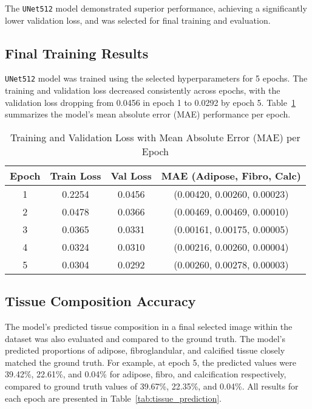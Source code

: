 The \texttt{UNet512} model demonstrated superior performance, achieving a significantly lower validation 
loss, and was selected for final training and evaluation.

\subsection{Final Training Results}

\texttt{UNet512} model was trained using the selected hyperparameters for 5 epochs. The training and validation 
loss decreased consistently across epochs, with the validation loss dropping from 0.0456 in epoch 1 to 0.0292 by 
epoch 5. Table~\ref{tab:final_metrics} summarizes the model's mean absolute error (MAE) performance per epoch.

\begin{table}[h]
\centering
\caption{Training and Validation Loss with Mean Absolute Error (MAE) per Epoch}
\label{tab:final_metrics}
\begin{tabular}{cccc}
\toprule
\textbf{Epoch} & \textbf{Train Loss} & \textbf{Val Loss} & \textbf{MAE (Adipose, Fibro, Calc)} \\
\midrule
1 & 0.2254 & 0.0456 & (0.00420, 0.00260, 0.00023) \\
2 & 0.0478 & 0.0366 & (0.00469, 0.00469, 0.00010) \\
3 & 0.0365 & 0.0331 & (0.00161, 0.00175, 0.00005) \\
4 & 0.0324 & 0.0310 & (0.00216, 0.00260, 0.00004) \\
5 & 0.0304 & 0.0292 & (0.00260, 0.00278, 0.00003) \\
\bottomrule
\end{tabular}
\end{table}


\subsection{Tissue Composition Accuracy}

The model's predicted tissue composition in a final selected image within the dataset was also evaluated and compared to the ground 
truth. The model's predicted proportions of adipose, fibroglandular, and calcified tissue closely matched the ground truth. 
For example, at epoch 5, the predicted values were 39.42\%, 22.61\%, and 0.04\% for adipose, fibro, and calcification respectively,
compared to ground truth values of 39.67\%, 22.35\%, and 0.04\%. All results for each epoch are presented in Table~\ref{tab:tissue_prediction}.

